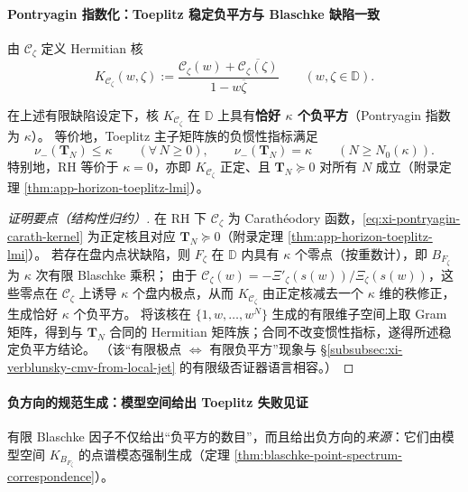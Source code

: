 \paragraph{Pontryagin 指数化：Toeplitz 稳定负平方与 Blaschke 缺陷一致}
由 \(\mathscr{C}_{\zeta}\) 定义 Hermitian 核
\begin{equation}\label{eq:xi-pontryagin-carath-kernel}
\boxed{\;
K_{\mathscr{C}_{\zeta}}(w,\zeta)
:=\frac{\mathscr{C}_{\zeta}(w)+\overline{\mathscr{C}_{\zeta}(\zeta)}}{1-w\overline{\zeta}}
\qquad(w,\zeta\in\mathbb{D}).\;}
\end{equation}

\begin{theorem}[Toeplitz 负平方指数 \(=\) Blaschke 缺陷维数]\label{thm:xi-toeplitz-negative-squares-equals-blaschke-defect}
在上述有限缺陷设定下，核 \(K_{\mathscr{C}_{\zeta}}\) 在 \(\mathbb{D}\) 上具有\textbf{恰好 \(\kappa\) 个负平方}（Pontryagin 指数为 \(\kappa\)）。
等价地，Toeplitz 主子矩阵族的负惯性指标满足
\[
\nu_-(\mathbf{T}_N)\le \kappa\qquad(\forall\,N\ge 0),
\qquad
\nu_-(\mathbf{T}_N)=\kappa\qquad(N\ge N_0(\kappa)).
\]
特别地，RH 等价于 \(\kappa=0\)，亦即 \(K_{\mathscr{C}_{\zeta}}\) 正定、且 \(\mathbf{T}_N\succeq 0\) 对所有 \(N\) 成立（附录定理 \ref{thm:app-horizon-toeplitz-lmi}）。
\end{theorem}

\begin{proof}[证明要点（结构性归约）]
在 RH 下 \(\mathscr{C}_{\zeta}\) 为 Carath\'eodory 函数，\eqref{eq:xi-pontryagin-carath-kernel} 为正定核且对应 \(\mathbf{T}_N\succeq 0\)（附录定理 \ref{thm:app-horizon-toeplitz-lmi}）。
若存在盘内点状缺陷，则 \(F_{\zeta}\) 在 \(\mathbb{D}\) 内具有 \(\kappa\) 个零点（按重数计），即 \(B_{F_{\zeta}}\) 为 \(\kappa\) 次有限 Blaschke 乘积；
由于 \(\mathscr{C}_{\zeta}(w)=-\Xi'_{\zeta}(s(w))/\Xi_{\zeta}(s(w))\)，这些零点在 \(\mathscr{C}_{\zeta}\) 上诱导 \(\kappa\) 个盘内极点，从而 \(K_{\mathscr{C}_{\zeta}}\) 由正定核减去一个 \(\kappa\) 维的秩修正，生成恰好 \(\kappa\) 个负平方。
将该核在 \(\{1,w,\dots,w^N\}\) 生成的有限维子空间上取 Gram 矩阵，得到与 \(\mathbf{T}_N\) 合同的 Hermitian 矩阵族；合同不改变惯性指标，遂得所述稳定负平方结论。
（该“有限极点 \(\Leftrightarrow\) 有限负平方”现象与 \S\ref{subsubsec:xi-verblunsky-cmv-from-local-jet} 的有限级否证器语言相容。）
\end{proof}

\paragraph{负方向的规范生成：模型空间给出 Toeplitz 失败见证}
有限 Blaschke 因子不仅给出“负平方的数目”，而且给出负方向的\emph{来源}：它们由模型空间 \(K_{B_{F_\zeta}}\) 的点谱模态强制生成（定理 \ref{thm:blaschke-point-spectrum-correspondence}）。

